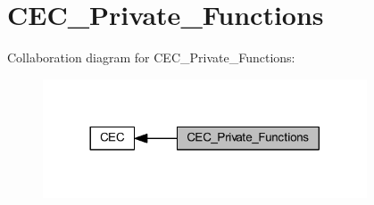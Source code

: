 \hypertarget{group___c_e_c___private___functions}{}\section{C\+E\+C\+\_\+\+Private\+\_\+\+Functions}
\label{group___c_e_c___private___functions}
Collaboration diagram for C\+E\+C\+\_\+\+Private\+\_\+\+Functions\+:
\nopagebreak
\begin{figure}[H]
\begin{center}
\leavevmode
\includegraphics[width=272pt]{group___c_e_c___private___functions}
\end{center}
\end{figure}
